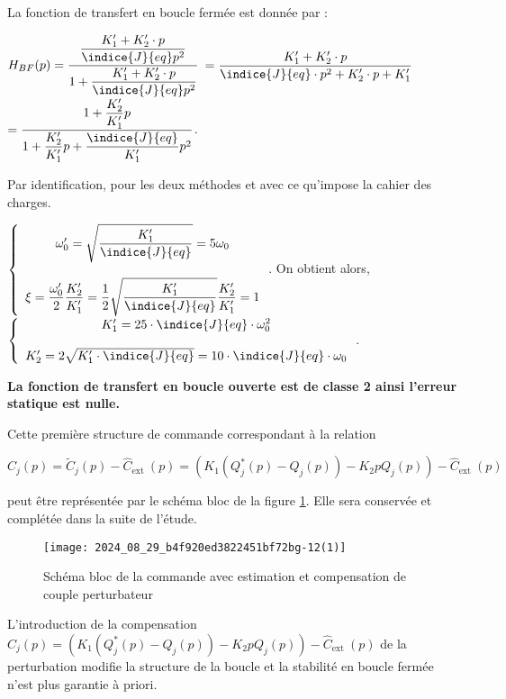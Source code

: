 \begin{corrige}
\begin{multicols}{2}
La fonction de transfert en boucle fermée est donnée par : 

$
H_{BF}(p)=\dfrac{\dfrac{K'_1+K'_2\cdot p}{\indice{J}{eq}p^2}}{1+\dfrac{K'_1+K'_2\cdot p}{\indice{J}{eq}p^2}}$
$ =\dfrac{K'_1+K'_2\cdot p}{\indice{J}{eq}\cdot p^2+K'_2\cdot p+K'_1}$
$=\dfrac{1+\dfrac{K'_2}{K'_1}p}{1+\dfrac{K'_2}{K'_1}p+\dfrac{\indice{J}{eq}}{K'_1}p^2}$.

\end{multicols}
Par identification, pour les deux méthodes et avec ce qu'impose la cahier des charges.

$
\left\{
\begin{array}{c}
\omega'_0=\sqrt{\dfrac{K'_1}{\indice{J}{eq}}}=5\omega_0\\
\\
\xi=\dfrac{\omega'_0}{2}\dfrac{K'_2}{K'_1}=\dfrac{1}{2}\sqrt{\dfrac{K'_1}{\indice{J}{eq}}}\dfrac{K'_2}{K'_1}=1
\end{array}
\right.
$. 
On obtient alors,
$
\left\{
\begin{array}{c}
K'_1=25\cdot \indice{J}{eq}\cdot \omega_0^2\\
\\
K'_2=2\sqrt{K'_1\cdot \indice{J}{eq}}=10\cdot \indice{J}{eq}\cdot \omega_0
\end{array}
\right.
$.

\textbf{La fonction de transfert en boucle ouverte est de classe 2 ainsi l'erreur statique est nulle. }
\end{corrige}
\else
\fi

\ifprof
\else

Cette première structure de commande correspondant à la relation

$$
C_{j}(p)=\tilde{C}_{j}(p)-\hat{C}_{\text {ext }}(p)=\left(K_{1}\left(Q_{j}^{*}(p)-Q_{j}(p)\right)-K_{2} p Q_{j}(p)\right)-\hat{C}_{\text {ext }}(p)
$$

peut être représentée par le schéma bloc de la figure \ref{fig_14}. Elle sera conservée et complétée dans la suite de l'étude.


\begin{figure}[!h]
\centering
\texttt{[image: 2024\_08\_29\_b4f920ed3822451bf72bg-12(1)]}
\caption{\label{fig_14} Schéma bloc de la commande avec estimation et compensation de couple perturbateur}
\end{figure}


L'introduction de la compensation $C_{j}(p)=\left(K_{1}\left(Q_{j}^{*}(p)-Q_{j}(p)\right)-K_{2} p Q_{j}(p)\right)-\hat{C}_{\text {ext }}(p)$ de la perturbation modifie la structure de la boucle et la stabilité en boucle fermée n'est plus garantie à priori.
\fi

